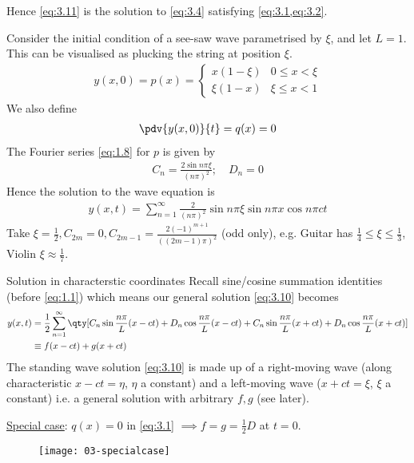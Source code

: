 Hence \cref{eq:3.11} is the solution to \cref{eq:3.4} satisfying \cref{eq:3.1,eq:3.2}.

\begin{example}
	Consider the initial condition of a see-saw wave parametrised by $\xi$, and let $L = 1$.
	This can be visualised as plucking the string at position $\xi$.
	\begin{align*}
		y(x,0) = p(x) = \begin{cases}
			x(1-\xi) & 0 \leq x < \xi \\
			\xi(1-x) & \xi \leq x < 1
		\end{cases}
	\end{align*}
	We also define
	\begin{align*}
		\pdv{y(x,0)}{t} = q(x) = 0
	\end{align*}
	The Fourier series \cref{eq:1.8} for $p$ is given by
	\begin{align*}
		C_n = \frac{2 \sin n \pi \xi}{(n \pi)^2};\quad D_n = 0
	\end{align*}
	Hence the solution to the wave equation is
	\begin{align*}
		y(x,t) = \sum_{n=1}^\infty \frac{2}{(n \pi)^2} \sin n \pi \xi \sin n \pi x \cos n \pi c t
	\end{align*}
	Take $\xi = \frac{1}{2}, C_{2m} = 0, C_{2m - 1} = \frac{2 (-1)^{m + 1}}{((2m-1) \pi)^2}$ (odd only), e.g. Guitar has $\frac{1}{4} \leq \xi \leq \frac{1}{3}$, Violin $\xi \approx \frac{1}{7}$.
\end{example}

\begin{aside}{Solution in characterstic coordinates}
	Recall sine/cosine summation identities (before \cref{eq:1.1}) which means our general solution \cref{eq:3.10} becomes
	\begin{align}
		y(x, t) &= \frac{1}{2} \sum_{n=1}^{\infty} \qty[C_n \sin \frac{n \pi}{L} (x-ct) + D_n \cos \frac{n \pi}{L} (x - ct) + C_n \sin \frac{n \pi}{L} (x + ct) + D_n \cos \frac{n \pi}{L} (x + ct)] \notag \\
		&\equiv f(x - ct) + g(x + ct) \label{eq:3.12}
	\end{align} 
	The standing wave solution \cref{eq:3.10} is made up of a right-moving wave (along characteristic $x - ct = \eta$, $\eta$ a constant) and a left-moving wave ($x + ct = \xi$, $\xi$ a constant) i.e. a general solution with arbitrary $f, g$ (see later).

	\underline{Special case}: $q(x) = 0$ in \cref{eq:3.1} $\implies f = g = \frac{1}{2} D$ at $t = 0$.
	\begin{figure}[h] 
		\centering 
		\texttt{[image: 03-specialcase]} 
	\end{figure}
	
\end{aside} 

